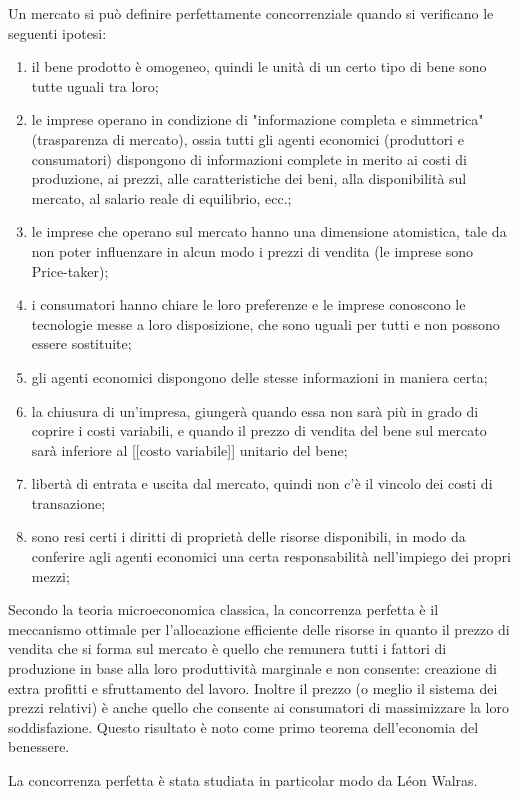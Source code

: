 Un mercato si può definire perfettamente concorrenziale quando si verificano le 
seguenti ipotesi:
\begin{enumerate}
 \item il bene prodotto è omogeneo, quindi le unità di un certo tipo di bene 
sono tutte uguali tra loro;
 \item le imprese operano in condizione di "informazione completa e simmetrica" 
(trasparenza di mercato), ossia tutti gli agenti economici (produttori e 
consumatori) dispongono di informazioni complete in merito ai costi di 
produzione, ai prezzi, alle caratteristiche dei beni, alla disponibilità sul 
mercato, al salario reale di equilibrio, ecc.;
 \item le imprese che operano sul mercato hanno una dimensione atomistica, tale 
da non poter influenzare in alcun modo i prezzi di vendita (le imprese sono 
Price-taker);
 \item i consumatori hanno chiare le loro preferenze e le imprese conoscono le 
tecnologie messe a loro disposizione, che sono uguali per tutti e non possono 
essere sostituite;
 \item gli agenti economici dispongono delle stesse informazioni in maniera 
certa;
 \item la chiusura di un'impresa, giungerà quando essa non sarà più in grado di 
coprire i costi variabili, e quando il prezzo di vendita del bene sul mercato 
sarà inferiore al [[costo variabile]] unitario del bene;
 \item libertà di entrata e uscita dal mercato, quindi non c'è il vincolo dei 
costi di transazione;
 \item sono resi certi i diritti di proprietà delle risorse disponibili, in modo 
da conferire agli agenti economici una certa responsabilità nell'impiego dei 
propri mezzi;
\end{enumerate}

Secondo la teoria microeconomica classica, la concorrenza 
perfetta è il meccanismo ottimale per l'allocazione efficiente delle risorse in 
quanto il prezzo di vendita che si forma sul mercato è quello che remunera 
tutti i fattori di produzione in base alla loro produttività marginale e non 
consente: creazione di extra profitti e sfruttamento del lavoro. Inoltre il 
prezzo (o meglio il sistema dei prezzi relativi) è anche quello che consente ai 
consumatori di massimizzare la loro soddisfazione. Questo risultato è noto 
come primo teorema dell'economia del benessere.

La concorrenza perfetta è stata studiata in particolar modo da Léon Walras.

